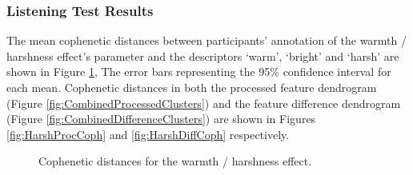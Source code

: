 		\subsubsection{Listening Test Results}
			The mean cophenetic distances between participants' annotation of the warmth / harshness effect's
			parameter and the descriptors `warm', `bright' and `harsh' are shown in Figure
			\ref{fig:HarshCophs}, The error bars representing the 95\% confidence interval for each mean.
			Cophenetic distances in both the processed feature dendrogram (Figure
			\ref{fig:CombinedProcessedClusters}) and the feature difference dendrogram (Figure
			\ref{fig:CombinedDifferenceClusters}) are shown in Figures \ref{fig:HarshProcCoph} and
			\ref{fig:HarshDiffCoph} respectively.

			\begin{figure}[h!]
				\centering
				\quad
				\caption{Cophenetic distances for the warmth / harshness effect.}
				\label{fig:HarshCophs}
			\end{figure}

